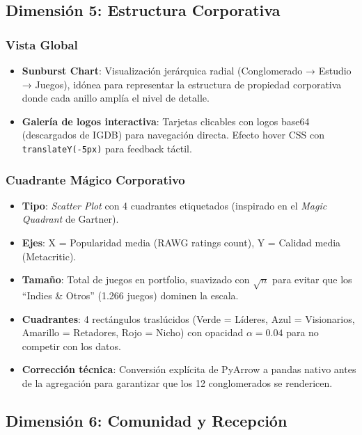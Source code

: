 \documentclass[11pt,a4paper]{article}
\begin{document}
\subsection{Dimensión 5: Estructura Corporativa}

\subsubsection{Vista Global}
\begin{itemize}
  \item \textbf{Sunburst Chart}: Visualización jerárquica radial (Conglomerado → Estudio → Juegos), idónea para representar la estructura de propiedad corporativa donde cada anillo amplía el nivel de detalle.
  \item \textbf{Galería de logos interactiva}: Tarjetas clicables con logos base64 (descargados de IGDB) para navegación directa. Efecto hover CSS con \texttt{translateY(-5px)} para feedback táctil.
\end{itemize}

\subsubsection{Cuadrante Mágico Corporativo}
\begin{itemize}
  \item \textbf{Tipo}: \textit{Scatter Plot} con 4 cuadrantes etiquetados (inspirado en el \textit{Magic Quadrant} de Gartner).
  \item \textbf{Ejes}: X = Popularidad media (RAWG ratings count), Y = Calidad media (Metacritic).
  \item \textbf{Tamaño}: Total de juegos en portfolio, suavizado con $\sqrt{n}$ para evitar que los ``Indies \& Otros'' (1.266 juegos) dominen la escala.
  \item \textbf{Cuadrantes}: 4 rectángulos traslúcidos (Verde = Líderes, Azul = Visionarios, Amarillo = Retadores, Rojo = Nicho) con opacidad $\alpha=0.04$ para no competir con los datos.
  \item \textbf{Corrección técnica}: Conversión explícita de PyArrow a pandas nativo antes de la agregación para garantizar que los 12 conglomerados se rendericen.
\end{itemize}

\subsection{Dimensión 6: Comunidad y Recepción}
\end{document}
